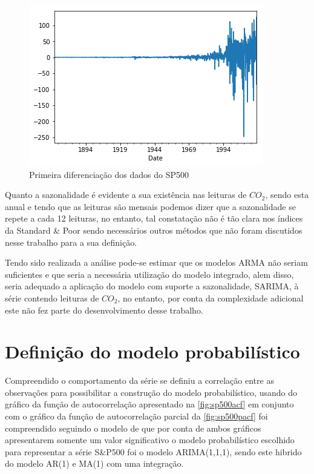 \documentclass[
    12pt,
    oneside,
    a4paper,
    english,
    brazil
]{abntex2}
\begin{document}
\begin{figure}[ht]
    \centering
    \caption{Primeira diferenciação dos dados do SP500}\label{fig:sp500diff}
    \includegraphics[width=.5\linewidth]{images/sp500diff.png}
\end{figure}

Quanto a sazonalidade é evidente a sua existência nas leituras de $CO_2$, sendo
esta anual e tendo que as leituras são mensais podemos dizer que a sazonalidade
se repete a cada  12 leituras, no entanto, tal constatação não  é tão clara nos
índices da  Standard \&  Poor sendo  necessários outros  métodos que  não foram
discutidos nesse trabalho para a sua definição.

Tendo sido realizada  a análise pode-se estimar que os  modelos ARMA não seriam
suficientes  e que  seria a  necessária  utilização do  modelo integrado,  alem
disso, seria adequado a aplicação do modelo com suporte a sazonalidade, SARIMA,
à série  contendo leituras  de $CO_2$,  no entanto,  por conta  da complexidade
adicional este não fez parte do desenvolvimento desse trabalho.

\section{Definição do modelo probabilístico}


Compreendido  o  comportamento  da  série  se definiu  a  correlação  entre  as
observações para possibilitar a construção  do modelo probabilístico, usando do
gráfico  da  função  de autocorrelação  apresentado  na  \autoref{fig:sp500acf}
em   conjunto  com   o  gráfico   da  função   de  autocorrelação   parcial  da
\autoref{fig:sp500pacf} foi compreendido seguindo  o modelo de 
que por conta  de ambos gráficos apresentarem somente um  valor significativo o
modelo probabilístico escolhido  para representar a série S\&P500  foi o modelo
ARIMA(1,1,1), sendo este hibrido do modelo AR(1) e MA(1) com uma integração.
\end{document}
